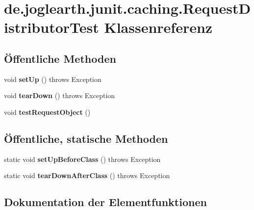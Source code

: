 \section{de.\-joglearth.\-junit.\-caching.\-Request\-Distributor\-Test Klassenreferenz}
\label{classde_1_1joglearth_1_1junit_1_1caching_1_1_request_distributor_test}
\subsection*{Öffentliche Methoden}
\begin{DoxyCompactItemize}
\item 
void {\bfseries set\-Up} ()  throws Exception \label{classde_1_1joglearth_1_1junit_1_1caching_1_1_request_distributor_test_a366583df1b445dce75d5dadfd549a9db}

\item 
void {\bfseries tear\-Down} ()  throws Exception \label{classde_1_1joglearth_1_1junit_1_1caching_1_1_request_distributor_test_a284e2305df8318a2376f61edaf7b0780}

\item 
void {\bf test\-Request\-Object} ()
\end{DoxyCompactItemize}
\subsection*{Öffentliche, statische Methoden}
\begin{DoxyCompactItemize}
\item 
static void {\bfseries set\-Up\-Before\-Class} ()  throws Exception \label{classde_1_1joglearth_1_1junit_1_1caching_1_1_request_distributor_test_ac793b3eadb2c843dbbf38a3d2a85f159}

\item 
static void {\bfseries tear\-Down\-After\-Class} ()  throws Exception \label{classde_1_1joglearth_1_1junit_1_1caching_1_1_request_distributor_test_a46c399748875f9b8c3da029cff8a3037}

\end{DoxyCompactItemize}


\subsection{Dokumentation der Elementfunktionen}
